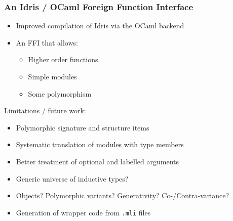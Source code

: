 \documentclass[aspectratio=169]{beamer}
\begin{document}
\begin{frame}[t]
  \frametitle{An Idris / OCaml Foreign Function Interface}

  \begin{itemize}
  \item Improved compilation of Idris via the OCaml backend
  \item An FFI that allows:
    \begin{itemize}
    \item Higher order functions
    \item Simple modules
    \item Some polymorphism
    \end{itemize}
  \end{itemize}

  \bigskip
  \pause

  Limitations / future work:
  \begin{itemize}
  \item Polymorphic signature and structure items
  \item Systematic translation of modules with type members
  \item Better treatment of optional and labelled arguments
  \item Generic universe of inductive types?
  \item Objects? Polymorphic variants? Generativity? Co-/Contra-variance?
  \item Generation of wrapper code from \texttt{.mli} files
  \end{itemize}
\end{frame}
\end{document}
